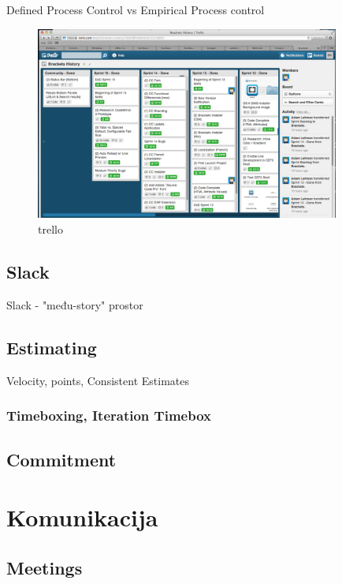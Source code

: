 \documentclass[lmodern, utf8, zavrsni]{fit}
\begin{document}
Defined Process Control vs Empirical Process control\citep{agiletransition}


\begin{figure}[H]
\centering
\includegraphics[width=10cm]{img/brackets_trello_sprint_history.png}
\caption{trello}
\end{figure}

\section{Slack}

Slack - "među-story" prostor\citep[str. 275]{agileart}

\section{Estimating}

Velocity, points,  Consistent Estimates

\subsection{Timeboxing, Iteration Timebox}

\section{Commitment}

\chapter{Komunikacija}

\section{Meetings}
\end{document}
